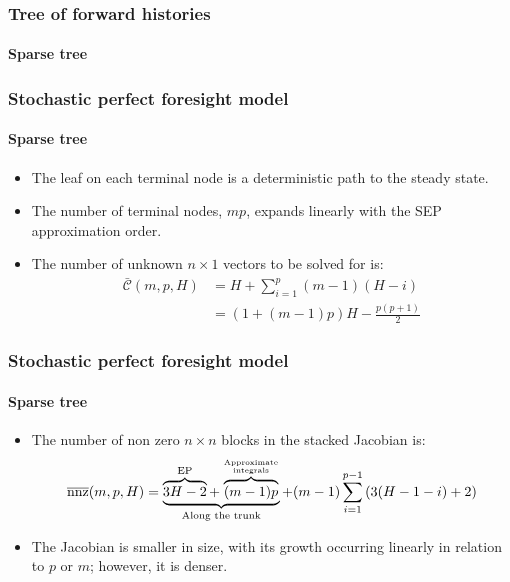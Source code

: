 \documentclass{beamer}
\begin{document}
\begin{frame}[c]{}
   \frametitle{Tree of forward histories}
   \framesubtitle{Sparse tree}
   \begin{center}
      \begin{tikzpicture}[scale=.7]
         
      \end{tikzpicture}
   \end{center}
\end{frame}


\begin{frame}
   \frametitle{Stochastic perfect foresight model}
   \framesubtitle{Sparse tree}

   \begin{itemize}

      \item The leaf on each terminal node is a deterministic path to the steady state.\newline

      \item The number of terminal nodes, $mp$, expands linearly with the SEP approximation order.\newline

      \item The number of unknown $n\times 1$ vectors to be solved for is:
            \[
               \begin{split}
                  \bar{\mathcal C}(m,p,H) & =  H+\sum_{i=1}^p(m-1)(H-i)                     \\
                                          & = \left( 1 + (m-1)p \right)H - \frac{p(p+1)}{2}
               \end{split}
            \]

   \end{itemize}

\end{frame}


\begin{frame}
   \frametitle{Stochastic perfect foresight model}
   \framesubtitle{Sparse tree}

   \begin{itemize}

      \item The number of non zero $n\times n$ blocks in the stacked Jacobian is:
            {\small
            \[
               \overline{\mathrm{nnz}}(m,p,H) = \underbrace{\overbrace{3H-2}^{\mathrm{EP}} + \overbrace{(m-1)p}^{\text{Approximate} \atop \text{integrals} }}_{\text{Along the trunk}} + (m-1)\sum_{i=1}^{p-1} \left( 3(H-1-i)+2  \right)
            \]}

            \medskip

      \item The Jacobian is smaller in size, with its growth occurring linearly in relation to \( p \) or \( m \); however, it is denser.

   \end{itemize}

\end{frame}
\end{document}
